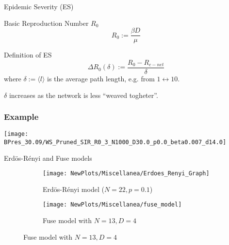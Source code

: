\documentclass[xcolor={dvipsnames}]{beamer}
\begin{document}
\begin{frame}{Epidemic Severity (ES)}
	\begin{block}{Basic Reproduction Number $ R_0$ }
		\begin{equation}
			R_0:= \frac{\beta D}{ \mu}
		\end{equation}
	\end{block}
	\begin{block}{Definition of ES}
		\begin{equation}
			\Delta R_0 (\delta):= \frac{R_0 - R_{c-net}}{\delta}
		\end{equation}
		where $\delta:=\langle l \rangle $ is the average path length, e.g. from $1 \leftrightarrow 10$.
		
		\vspace{0.5cm}
		$ \delta$ increases as the network is less ``weaved togheter''. 
	\end{block}
\end{frame}

\begin{frame}
	\frametitle{Example}
	\texttt{[image: BPres\_30.09/WS\_Pruned\_SIR\_R0\_3\_N1000\_D30.0\_p0.0\_beta0.007\_d14.0]}
\end{frame}

\begin{frame}{Erdös-Rényi and Fuse models}
	\begin{figure}
		\begin{subfigure}[c]{.48\linewidth}
			\texttt{[image: NewPlots/Miscellanea/Erdoes\_Renyi\_Graph]}
			\caption{Erdös-Rényi model ($N = 22, p = 0.1$)}
		\end{subfigure}
		\hspace{0.3mm}
		\begin{subfigure}[c]{.48\linewidth}
			\texttt{[image: NewPlots/Miscellanea/fuse\_model]} %
			\caption{Fuse model with $N = 13, D = 4$}
		\end{subfigure}%
	\end{figure}
\end{frame}
\end{document}

